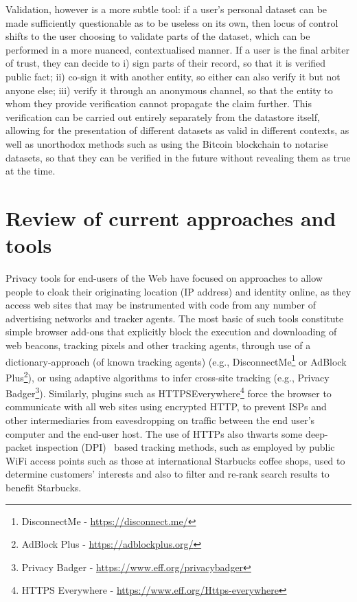 \documentclass{IOS-Book-Article}     %
\begin{document}
Validation, however is a more subtle tool:
if a user's personal dataset can be made sufficiently questionable as to be useless on its own,
then locus of control shifts to the user choosing to validate parts of the dataset,
which can be performed in a more nuanced,
contextualised manner. If a user is the final arbiter of trust, they can decide
to i) sign parts of their record, so that it is verified public fact; ii)
co-sign it with another entity, so either can  also verify it but not anyone 
else;
iii) verify it through an anonymous channel, so that the entity to whom they
provide verification cannot propagate the claim further. This verification can
be carried out entirely separately from the datastore itself, allowing for the
presentation of different datasets as valid  in different contexts, as well as
unorthodox methods such as using the Bitcoin blockchain to notarise datasets, so
that they can be verified in the future without revealing them as true at the
time.

\section{Review of current approaches and tools} 

Privacy tools for end-users of the Web have focused on approaches to allow people to cloak their originating location (IP address) and identity online, as they access web sites that may be instrumented with code from any number of advertising networks and tracker agents.  The most basic of such tools constitute simple browser add-ons that explicitly block the execution and downloading of web beacons, tracking pixels and other tracking agents, through use of a dictionary-approach (of known tracking agents) (e.g., DisconnectMe\footnote{DisconnectMe - \url{https://disconnect.me/}} or AdBlock Plus\footnote{AdBlock Plus - \url{https://adblockplus.org/}}), or using adaptive algorithms to infer cross-site tracking (e.g., Privacy Badger\footnote{Privacy Badger - \url{https://www.eff.org/privacybadger}}).  Similarly, plugins such as HTTPSEverywhere\footnote{HTTPS Everywhere - \url{https://www.eff.org/Https-everywhere}} force the browser to communicate with all web sites using encrypted HTTP, to prevent ISPs and other intermediaries from eavesdropping on traffic between the end user's computer and the end-user host.  The use of HTTPs also thwarts some deep-packet inspection (DPI)~\cite{kumar2006advanced} based tracking methods, such as employed by public WiFi access points such as those at international Starbucks coffee shops, used to determine customers' interests and also to filter and re-rank search results to benefit Starbucks.
\end{document}
